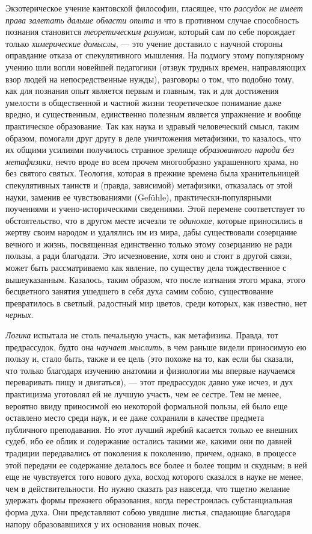 \label{bkm:Ref474526580} Экзотерическое учение кантовской философии, гласящее, что
{\em рассудок не имеет права залетать дальше области
опыта} и что в противном случае способность познания становится
{\em теоретическим разумом}, который сам по себе
порождает только {\em химерические домыслы}, — это
учение доставило с научной стороны оправдание отказа от спекулятивного
мышления. На подмогу этому популярному учению шли вопли новейшей педагогики
(отзвук трудных времен, направляющих взор людей на непосредственные нужды),
разговоры о том, что подобно тому, как для познания опыт является первым и
главным, так и для достижения умелости в общественной и частной жизни
теоретическое понимание даже вредно, и существенным, единственно полезным
является упражнение и вообще практическое образование. Так как наука и
здравый человеческий смысл, таким образом, помогали друг другу в деле
уничтожения метафизики, то казалось, что их общими усилиями получилось
странное зрелище {\em образованного народа без
метафизики}, нечто вроде во всем прочем многообразно украшенного храма, но
без святого святых. Теология, которая в прежние времена была хранительницей
спекулятивных таинств и (правда, зависимой) метафизики, отказалась от этой
науки, заменив ее чувствованиями (Gefühle), практически-популярными
поучениями и учено-историческими сведениями. Этой перемене соответствует то
обстоятельство, что в другом месте исчезли те
{\em одинокие}, которые приносились в жертву своим
народом и удалялись им из мира, дабы существовали созерцание вечного и
жизнь, посвященная единственно только этому созерцанию не ради пользы, а
ради благодати. Это исчезновение, хотя оно и стоит в другой связи, может
быть рассматриваемо как явление, по существу дела тождественное с
вышеуказанным. Казалось, таким образом, что после изгнания этого мрака,
этого бесцветного занятия ушедшего в себя духа самим собою, существование
превратилось в светлый, радостный мир цветов, среди которых, как известно,
нет {\em черных}.

{\em Логика} испытала не столь печальную участь, как
метафизика. Правда, тот предрассудок, будто она
{\em научает мыслить}, в чем раньше видели приносимую
ею пользу и, стало быть, также и ее цель (это похоже на то, как если бы
сказали, что только благодаря изучению анатомии и физиологии мы впервые
научаемся переваривать пищу и двигаться), — этот предрассудок давно уже
исчез, и дух практицизма уготовлял ей не лучшую участь, чем ее сестре. Тем
не менее, вероятно ввиду приносимой ею некоторой формальной пользы, ей было
еще оставлено место среди наук, и ее даже сохранили в качестве предмета
публичного преподавания. Но этот лучший жребий касается только ее внешних
судеб, ибо ее облик и содержание остались такими же, какими они по давней
традиции передавались от поколения к поколению, причем, однако, в процессе
этой передачи ее содержание делалось все более и более тощим и скудным; в
ней еще не чувствуется того нового духа, восход которого сказался в науке
не менее, чем в действительности. Но нужно сказать раз навсегда, что тщетно
желание удержать формы прежнего образования, когда перестроилась
субстанциальная форма духа. Они представляют собою увядшие листья,
спадающие благодаря напору образовавшихся у их основания новых почек.

